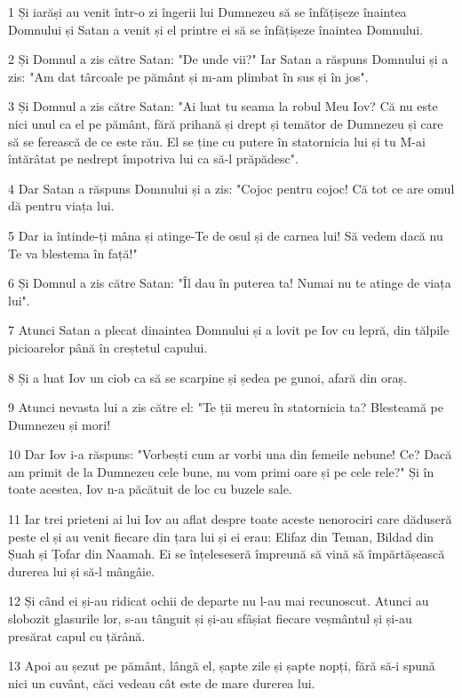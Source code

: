 \par 1 Și iarăși au venit într-o zi îngerii lui Dumnezeu să se înfățișeze înaintea Domnului și Satan a venit și el printre ei să se înfățișeze înaintea Domnului.
\par 2 Și Domnul a zis către Satan: "De unde vii?" Iar Satan a răspuns Domnului și a zis: "Am dat târcoale pe pământ și m-am plimbat în sus și în jos".
\par 3 Și Domnul a zis către Satan: "Ai luat tu seama la robul Meu Iov? Că nu este nici unul ca el pe pământ, fără prihană și drept și temător de Dumnezeu și care să se ferească de ce este rău. El se ține cu putere în statornicia lui și tu M-ai întărâtat pe nedrept împotriva lui ca să-l prăpădesc".
\par 4 Dar Satan a răspuns Domnului și a zis: "Cojoc pentru cojoc! Că tot ce are omul dă pentru viața lui.
\par 5 Dar ia întinde-ți mâna și atinge-Te de osul și de carnea lui! Să vedem dacă nu Te va blestema în față!"
\par 6 Și Domnul a zis către Satan: "Îl dau în puterea ta! Numai nu te atinge de viața lui".
\par 7 Atunci Satan a plecat dinaintea Domnului și a lovit pe Iov cu lepră, din tălpile picioarelor până în creștetul capului.
\par 8 Și a luat Iov un ciob ca să se scarpine și ședea pe gunoi, afară din oraș.
\par 9 Atunci nevasta lui a zis către el: "Te ții mereu în statornicia ta? Blesteamă pe Dumnezeu și mori!
\par 10 Dar Iov i-a răspuns: "Vorbești cum ar vorbi una din femeile nebune! Ce? Dacă am primit de la Dumnezeu cele bune, nu vom primi oare și pe cele rele?" Și în toate acestea, Iov n-a păcătuit de loc cu buzele sale.
\par 11 Iar trei prieteni ai lui Iov au aflat despre toate aceste nenorociri care dăduseră peste el și au venit fiecare din țara lui și ei erau: Elifaz din Teman, Bildad din Șuah și Țofar din Naamah. Ei se înțeleseseră împreună să vină să împărtășească durerea lui și să-l mângâie.
\par 12 Și când ei și-au ridicat ochii de departe nu l-au mai recunoscut. Atunci au slobozit glasurile lor, s-au tânguit și și-au sfâșiat fiecare veșmântul și și-au presărat capul cu țărână.
\par 13 Apoi au șezut pe pământ, lângă el, șapte zile și șapte nopți, fără să-i spună nici un cuvânt, căci vedeau cât este de mare durerea lui.

